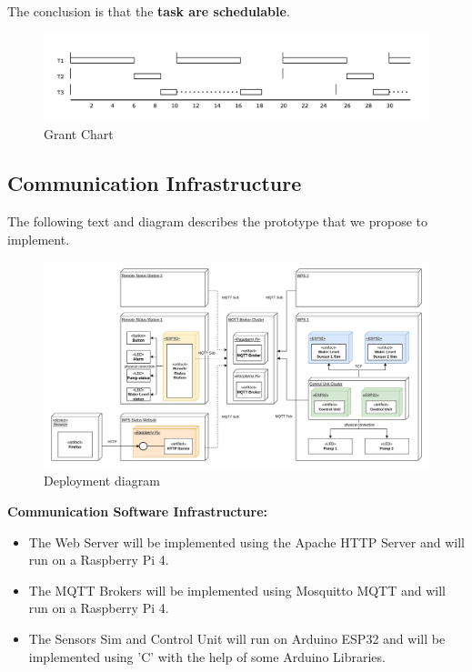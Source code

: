 \documentclass[11pt]{article}
\begin{document}
The conclusion is that the \textbf{task are schedulable}.

\begin{figure}[H]
  \centering
  \includegraphics[width=\linewidth]{../diagrams/rt-grant-chart.jpg}
  \caption{Grant Chart}
  \label{fig:Grant Chart}
\end{figure}


\newpage
\subsection{Communication Infrastructure}

The following text and diagram describes the prototype that we propose to implement. 

\begin{figure}[H]
  \centering
  \includegraphics[width=\linewidth]{../diagrams/deployment-diagram-WPS.jpg}
  \caption{Deployment diagram}
  \label{fig:Deployment Diagram}
\end{figure}

\textbf{Communication Software Infrastructure:}

\begin{itemize}
	\item The Web Server will be implemented using the Apache HTTP Server and will run on a Raspberry Pi 4.
	\item The MQTT Brokers will be implemented using Mosquitto MQTT and will run on a Raspberry Pi 4.
	\item The Sensors Sim and Control Unit will run on Arduino ESP32 and will be implemented using 'C' with the help of some Arduino Libraries. 
\end{itemize}
\end{document}

